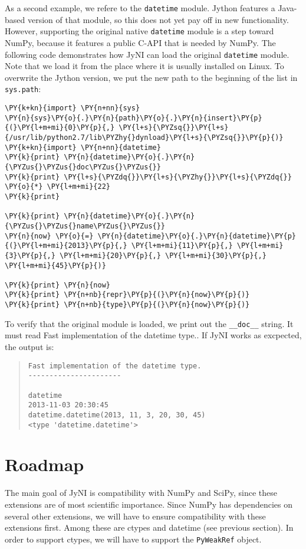 \documentclass[letterpaper,compsoc,twoside]{IEEEtran}
\makeatletter
\def\PY@reset{\let\PY@it=\relax \let\PY@bf=\relax \let\PY@ul=\relax \let\PY@tc=\relax \let\PY@bc=\relax \let\PY@ff=\relax}
\def\PY@tok#1{\csname PY@tok@#1\endcsname}
\def\PY@toks#1+{\ifx\relax#1\empty\else \PY@tok{#1}\expandafter\PY@toks\fi}
\def\PY@do#1{\PY@bc{\PY@tc{\PY@ul{\PY@it{\PY@bf{\PY@ff{#1}}}}}}}
\def\PY#1#2{\PY@reset\PY@toks#1+\relax+\PY@do{#2}}
\def\PYZus{\char`\_}
\def\PYZhy{\char`\-}
\def\PYZsq{\char`\'}
\def\PYZdq{\char`\"}
\makeatother
\begin{document}
As a second example, we refere to the \texttt{datetime} module. Jython features a Java-based version of that module, so this does not yet pay off in new functionality.
However, supporting the original native \texttt{datetime} module is a step toward NumPy,
because it features a public C-API that is needed by NumPy. The following code demonstrates how JyNI can load the original \texttt{datetime} module. Note that we load it
from the place where it is usually installed on Linux. To overwrite the Jython version,
we put the new path to the beginning of the list in \texttt{sys.path}:\begin{Verbatim}[commandchars=\\\{\},fontsize=\footnotesize]
\PY{k+kn}{import} \PY{n+nn}{sys}
\PY{n}{sys}\PY{o}{.}\PY{n}{path}\PY{o}{.}\PY{n}{insert}\PY{p}{(}\PY{l+m+mi}{0}\PY{p}{,} \PY{l+s}{\PYZsq{}}\PY{l+s}{/usr/lib/python2.7/lib\PYZhy{}dynload}\PY{l+s}{\PYZsq{}}\PY{p}{)}
\PY{k+kn}{import} \PY{n+nn}{datetime}
\PY{k}{print} \PY{n}{datetime}\PY{o}{.}\PY{n}{\PYZus{}\PYZus{}doc\PYZus{}\PYZus{}}
\PY{k}{print} \PY{l+s}{\PYZdq{}}\PY{l+s}{\PYZhy{}}\PY{l+s}{\PYZdq{}} \PY{o}{*} \PY{l+m+mi}{22}
\PY{k}{print}

\PY{k}{print} \PY{n}{datetime}\PY{o}{.}\PY{n}{\PYZus{}\PYZus{}name\PYZus{}\PYZus{}}
\PY{n}{now} \PY{o}{=} \PY{n}{datetime}\PY{o}{.}\PY{n}{datetime}\PY{p}{(}\PY{l+m+mi}{2013}\PY{p}{,} \PY{l+m+mi}{11}\PY{p}{,} \PY{l+m+mi}{3}\PY{p}{,} \PY{l+m+mi}{20}\PY{p}{,} \PY{l+m+mi}{30}\PY{p}{,} \PY{l+m+mi}{45}\PY{p}{)}

\PY{k}{print} \PY{n}{now}
\PY{k}{print} \PY{n+nb}{repr}\PY{p}{(}\PY{n}{now}\PY{p}{)}
\PY{k}{print} \PY{n+nb}{type}\PY{p}{(}\PY{n}{now}\PY{p}{)}
\end{Verbatim}
To verify that the original module is loaded, we print out the \texttt{\_\_doc\_\_} string. It must read \textquotedbl{}Fast implementation of the datetime type.\textquotedbl{}. If JyNI works as excpected, the
output is:\begin{quote}\begin{verbatim}
Fast implementation of the datetime type.
----------------------

datetime
2013-11-03 20:30:45
datetime.datetime(2013, 11, 3, 20, 30, 45)
<type 'datetime.datetime'>
\end{verbatim}

\end{quote}


\section{Roadmap\label{roadmap}}
The main goal of JyNI is compatibility with NumPy and SciPy, since these extensions are of most scientific importance.
Since NumPy has dependencies on several other extensions, we will have to ensure compatibility with these extensions first.
Among these are ctypes and datetime (see previous section). In order to support ctypes, we will have to support the \texttt{PyWeakRef} object.
\end{document}
